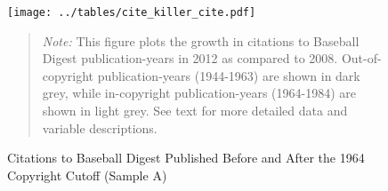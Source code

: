 \begin{figure}[!htbp]
\begin{center}
\caption{Citations to Baseball Digest Published Before and After the 1964 Copyright Cutoff (Sample A)}
\label{fig:killer_cite}
\vspace{1cm}

\texttt{[image: ../tables/cite\_killer\_cite.pdf]}



\end{center}
\vspace{1cm}
\begin{quote}
\emph{Note:} This figure plots the growth in citations to Baseball Digest publication-years in 2012 as compared to 2008. Out-of-copyright publication-years (1944-1963) are shown in dark grey, while in-copyright publication-years (1964-1984) are shown in light grey. See text for more detailed data and variable descriptions. 

\end{quote}
\end{figure}

\newpage



\newpage

